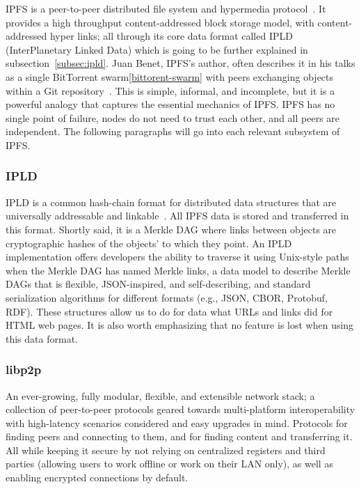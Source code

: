 IPFS is a peer-to-peer distributed file system and hypermedia protocol~\cite{IPFS}.
It provides a high throughput content-addressed block storage model, with content-addressed hyper links; all through its core data format called IPLD (InterPlanetary Linked Data) which is going to be further explained in subsection~\ref{subsec:ipld}.
Juan Benet, IPFS's author, often describes it in his talks as a single BitTorrent swarm\ref{bittorent-swarm} with peers exchanging objects within a Git repository~\cite{github:ipfspaper}.
This is simple, informal, and incomplete, but it is a powerful analogy that captures the essential mechanics of IPFS.
IPFS has no single point of failure, nodes do not need to trust each other, and all peers are independent.
The following paragraphs will go into each relevant subsystem of IPFS.

\subsubsection{\label{subsubsec:ipld}IPLD}

IPLD is a common hash-chain format for distributed data structures that are universally addressable and linkable~\cite{github:ipld}.
All IPFS data is stored and transferred in this format.
Shortly said, it is a Merkle DAG where links between objects are cryptographic hashes of the objects' to which they point.
An IPLD implementation offers developers the ability to traverse it using Unix-style paths when the Merkle DAG has named Merkle links, a data model to describe Merkle DAGs that is flexible, JSON-inspired, and self-describing, and standard serialization algorithms for different formats (e.g., JSON, CBOR, Protobuf, RDF).
These structures allow us to do for data what URLs and links did for HTML web pages.
It is also worth emphasizing that no feature is lost when using this data format.

\subsubsection{\label{subsubsec:libp2p}libp2p}

An ever-growing, fully modular, flexible, and extensible network stack; a collection of peer-to-peer protocols geared towards multi-platform interoperability with high-latency scenarios considered and easy upgrades in mind.
Protocols for finding peers and connecting to them, and for finding content and transferring it.
All while keeping it secure by not relying on centralized registers and third parties (allowing users to work offline or work on their LAN only), as well as enabling encrypted connections by default.

